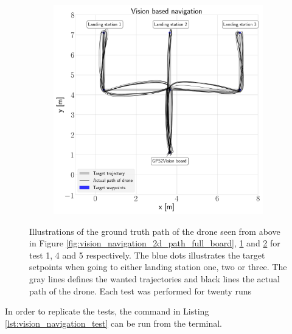 \documentclass[../Head/report.tex]{subfiles}
\begin{document}
\begin{figure}[H]
\begin{subfigure}[t]{.30\textwidth}
        \caption{}
        \label{fig:vision_navigation_2d_path_missing_markers_wear_vel_1.0}
    \end{subfigure}
     \hspace{0.2em}
    \begin{subfigure}[t]{.30\textwidth}
        \centering
        \includegraphics[width=\textwidth]{../Figures/vision_navigation/test5_one_pattern_missing_markers_wear_board/2d_path.png}
        \caption{}
        \label{fig:vision_navigation_2d_path_missing_markers_wear_vel_5.0}
    \end{subfigure}
    \caption{Illustrations of the ground truth path of the drone seen from above in Figure \ref{fig:vision_navigation_2d_path_full_board}, \ref{fig:vision_navigation_2d_path_missing_markers_wear_vel_1.0} and \ref{fig:vision_navigation_2d_path_missing_markers_wear_vel_5.0} for test 1, 4 and 5 respectively. The blue dots illustrates the target setpoints when going to either landing station one, two or three. The gray lines defines the wanted trajectories and black lines the actual path of the drone. Each test was performed for twenty runs}
    \label{fig:vision_navigation_2d_path}
\end{figure}  

In order to replicate the tests, the command in Listing \ref{lst:vision_navigation_test} can be run from the terminal.
\end{document}
